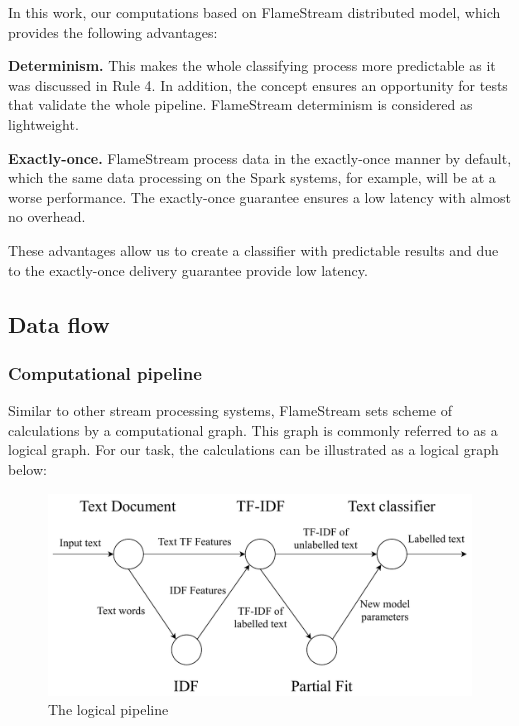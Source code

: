 In this work, our computations based on FlameStream \cite{kuralenok2018flamestream} distributed model, which provides the following advantages:

\textbf{Determinism.} This makes the whole classifying process more predictable as it was discussed in \cite{stonebraker20058} Rule 4. In addition, the concept ensures an opportunity for tests that validate the whole pipeline. FlameStream determinism is considered as lightweight.

\textbf{Exactly-once.} FlameStream process data in the exactly-once manner by default, which the same data processing on the Spark systems, for example, will be at a worse performance. The exactly-once guarantee ensures a low latency with almost no overhead.

These advantages allow us to create a classifier with predictable results and due to the exactly-once delivery guarantee provide low latency.

\subsection{Data flow \label{DF}}

\subsubsection{Computational pipeline}

Similar to other stream processing systems, FlameStream sets scheme of calculations by a computational graph. This graph is commonly referred to as a logical graph. For our task, the calculations can be illustrated as a logical graph below:

\begin{figure}[htbp]
  \centering
  \includegraphics[scale=0.48]{pics/logical-graph}
  \caption{The logical pipeline}
  \label {logical graph}
\end{figure}

